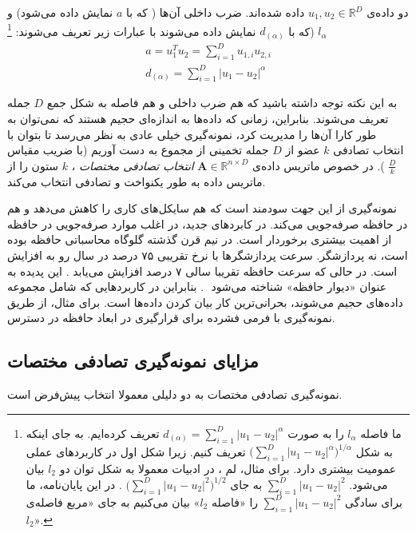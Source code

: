 دو داده‌ی 
$u_1, u_2 \in \mathbb{R}^D$
داده شده‌اند. ضرب داخلی آن‌ها ( که با 
$a$
نمایش داده می‌شود) و 
$l_\alpha$
(که با 
$d_{(\alpha)}$
نمایش داده می‌شوند با عبارات زیر تعریف می‌شوند:
\footnote{
ما فاصله $l_\alpha$ را به صورت 
$d_{(\alpha)} = \sum_{i=1}^{D} \mathopen| u_1 - u_2 \mathclose|^\alpha$
تعریف کرده‌ایم. به جای اینکه به شکل
$\mathopen( \sum_{i=1}^{D} \mathopen| u_1 - u_2 \mathclose|^\alpha \mathclose)^{1/\alpha}$
تعریف کنیم. زیرا شکل اول در کاربردهای عملی عمومیت بیشتری دارد. برای مثال، لم 
، در ادبیات معمولا به شکل توان دو $l_2$ بیان می‌شود. 
$\sum_{i=1}^{D} \mathopen| u_1 - u_2 \mathclose|^2$
به جای 
$\mathopen( \sum_{i=1}^{D} \mathopen| u_1 - u_2 \mathclose|^2 \mathclose)^{1/2}$
. در این پایان‌نامه، ما برای سادگی 
$\sum_{i=1}^{D} \mathopen| u_1 - u_2 \mathclose|^2$
را «فاصله $l_2$» بیان می‌کنیم به جای «مربع فاصله‌ی $l_2$».
}
\begin{align}
a=u_1^T u_2 = \sum_{i=1}^{D} u_{1,i} u_{2,i} \\
d_{(\alpha)} = \sum_{i=1}^{D} \mathopen| u_1 - u_2 \mathclose|^\alpha 
\label{eq:1hP}
\end{align}

به این نکته توجه داشته باشید که هم ضرب داخلی و هم فاصله به شکل جمع
$D$
جمله تعریف می‌شوند. بنابراین، زمانی که داده‌ها به اندازه‌ای حجیم هستند که نمی‌توان به طور کارا آن‌ها را مدیریت کرد، نمونه‌گیری خیلی عادی به نظر می‌رسد تا بتوان با انتخاب تصادفی 
$k$
عضو از 
$D$
جمله تخمینی از مجموع به دست آوریم
(با ضریب مقیاس 
$\frac{D}{k}$
). در خصوص ماتریس داده‌ی 
$\mathbf{A} \in \mathbb{R}^{n \times D}$
\textit{
انتخاب تصادفی مختصات
}
، $k$ ستون را از ماتریس داده به طور یکنواخت و تصادفی انتخاب می‌کند.

نمونه‌گیری از این جهت سودمند است که هم سایکل‌های کاری 
را کاهش ‌می‌دهد و هم در حافظه صرفه‌جویی می‌کند. در کابردهای جدید، در اغلب موارد صرفه‌جویی در حافظه از اهمیت بیشتری برخوردار است. در نیم قرن گذشته گلوگاه‌ محاسباتی حافظه بوده است، نه پردازشگر. سرعت پردازشگرها با نرخ تقریبی ۷۵ درصد در سال رو به افزایش است. در حالی که سرعت حافظه تقریبا سالی ۷ درصد افزایش می‌یابد
\cite{litez139}
. این پدیده به عنوان «دیوار حافظه»
شناخته می‌شود
‌\cite{litez139, litez168}
. بنابراین در کاربردهایی که شامل مجموعه داده‌های حجیم می‌شوند، بحرانی‌ترین کار بیان کردن داده‌ها است. برای مثال،
از طریق نمونه‌گیری با فرمی فشرده برای قرارگیری در ابعاد حافظه در دسترس.


\subsection{مزایای نمونه‌گیری تصادفی مختصات}
نمونه‌گیری تصادفی مختصات به دو دلیلی معمولا انتخاب پیش‌فرض است.

